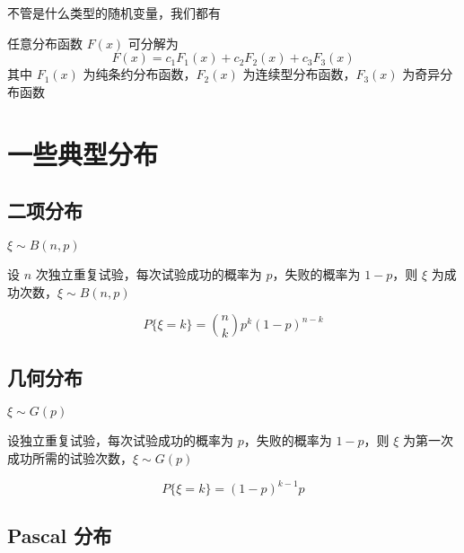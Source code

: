 \documentclass[12pt,a4paper]{amsart}
\begin{document}
不管是什么类型的随机变量，我们都有

\begin{proposition}[Lebesgue 分解]
    任意分布函数 $F(x)$ 可分解为
    \begin{equation}
        F(x) = c_1F_1(x) + c_2F_2(x) + c_3F_3(x)
    \end{equation}
    其中 $F_1(x)$ 为纯条约分布函数，$F_2(x)$ 为连续型分布函数，$F_3(x)$ 为奇异分布函数
\end{proposition}

\section{一些典型分布}

\subsection{二项分布}

$\xi\sim B(n,p)$

\begin{definition}[二项分布]
    设 $n$ 次独立重复试验，每次试验成功的概率为 $p$，失败的概率为 $1-p$，则 $\xi$ 为成功次数，$\xi\sim B(n,p)$
\end{definition}

\begin{proposition}[二项分布的分布函数]
    \begin{equation}
        P\{\xi=k\} = \binom{n}{k}p^k(1-p)^{n-k}
    \end{equation}
\end{proposition}

\subsection{几何分布}

$\xi\sim G(p)$

\begin{definition}[几何分布]
    设独立重复试验，每次试验成功的概率为 $p$，失败的概率为 $1-p$，则 $\xi$ 为第一次成功所需的试验次数，$\xi\sim G(p)$
\end{definition}

\begin{proposition}[几何分布的分布函数]
    \begin{equation}
        P\{\xi=k\} = (1-p)^{k-1}p
    \end{equation}
\end{proposition}

\subsection{Pascal 分布}
\end{document}

